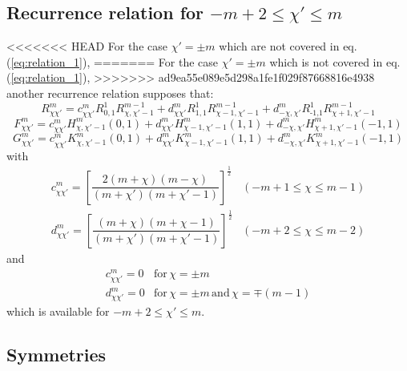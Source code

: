 \subsection{Recurrence relation for $-m+2\leq\chi'\leq m$}

<<<<<<< HEAD
For the case $\chi'=\pm m$ which are not covered in eq. (\ref{eq:relation_1}),
=======
For the case $\chi'=\pm m$ which is not covered in eq. (\ref{eq:relation_1}),
>>>>>>> ad9ea55e089e5d298a1fe1f029f87668816e4938
another recurrence relation supposes that:
\begin{equation}
R_{\chi\chi'}^{m}=c_{\chi\chi'}^{m}R_{0,1}^{1}R_{\chi,\chi'-1}^{m-1}+d_{\chi\chi'}^{m}R_{1,1}^{1}R_{\chi-1,\chi'-1}^{m-1}+d_{-\chi,\chi'}^{m}R_{\text{-1,}1}^{1}R_{\chi+1,\chi'-1}^{m-1}
\end{equation}
\begin{equation}
F_{\chi\chi'}^{m}=c_{\chi\chi'}^{m}H_{\chi,\chi'-1}^{m}(0,1)+d_{\chi\chi'}^{m}H_{\chi-1,\chi'-1}^{m}(1,1)+d_{-\chi,\chi'}^{m}H_{\chi+1,\chi'-1}^{m}(-1,1)
\end{equation}
\begin{equation}
G_{\chi\chi'}^{m}=c_{\chi\chi'}^{m}K_{\chi,\chi'-1}^{m}(0,1)+d_{\chi\chi'}^{m}K_{\chi-1,\chi'-1}^{m}(1,1)+d_{-\chi,\chi'}^{m}K_{\chi+1,\chi'-1}^{m}(-1,1)
\end{equation}
with
\begin{equation}
\begin{array}{ll}
c_{\chi\chi'}^{m}=\left[\dfrac{2\left(m+\chi\right)\left(m-\chi\right)}{\left(m+\chi'\right)\left(m+\chi'-1\right)}\right]^{\frac{1}{2}} & (-m+1\leq\chi\leq m-1)\\
d_{\chi\chi'}^{m}=\left[\dfrac{\left(m+\chi\right)\left(m+\chi-1\right)}{\left(m+\chi'\right)\left(m+\chi'-1\right)}\right]^{\frac{1}{2}} & (-m+2\leq\chi\leq m-2)
\end{array}
\end{equation}
and
\begin{equation}
\begin{array}{ll}
c_{\chi\chi'}^{m}=0 & \mathrm{for}\,\chi=\pm m\\
d_{\chi\chi'}^{m}=0 & \mathrm{for}\,\chi=\pm m\,\mathrm{and}\,\chi=\mp(m-1)
\end{array}
\end{equation}
which is available for $-m+2\leq\chi'\leq m$.


\subsection{Symmetries}

